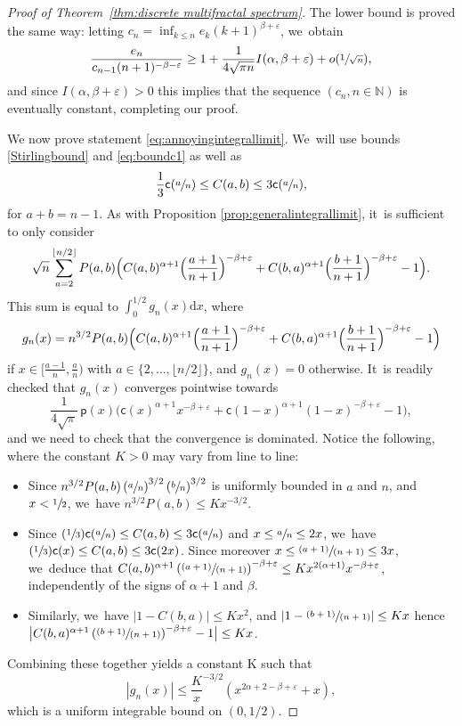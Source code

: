 \documentclass[11pt]{article}
\let\epsilon\varepsilon
\newcommand{\Psfrac}[2]{(\sfrac{#1}{#2})}
\newcommand{\pspfrac}[2]{\sfrac{(#1)}{(#2)}}
\newcommand{\pp}{\mathsf{p}}
\newcommand{\cc}{\mathsf{c}}\let\ff\cc
\newcommand{\N}{\mathbb{N}}
\let\veps\varepsilon
\theoremstyle{definition}
\begin{document}
\begin{proof}[Proof of Theorem~\ref{thm:discrete multifractal spectrum}]
The lower bound is proved the same way: letting $c_n=\inf_{k\leq n}e_k (k+1)^{\beta+\veps}$, we~obtain\vspace*{-3pt}
\[
\frac{e_n}{c_{n-1}(n+1)^{-\beta-\veps}} \geq 1 + \frac1{4\sqrt{\pi n}}I(\alpha,\beta+\veps) + o(\sfrac1{\sqrt{n}}),
\]
and since $I(\alpha,\beta+\veps)>0$ this implies that the sequence $(c_n,n\in\N)$ is eventually constant, completing our proof.

We now prove statement \eqref{eq:annoyingintegrallimit}. We~will use bounds \eqref{Stirlingbound} and \eqref{eq:boundc1} as well as\vspace*{-3pt}
\[
\frac1{3} \cc{\left(\sfrac{a}{n}\right)}\leq C(a,b)\leq 3 \cc{(\sfrac{a}{n})},
\]
for $a+b=n-1$. As with Proposition \ref{prop:generalintegrallimit}, it~is sufficient to only consider\vspace*{-3pt}
\[
\sqrt{n}\sum_{a=2}^{\lfloor n/2 \rfloor}P(a,b)\Bigl(C(a,b)^{\alpha+1}\Bigl(\frac{a+1}{n+1}\Bigr)^{-\beta+\veps}+C(b,a)^{\alpha+1}\Bigl(\frac{b+1}{n+1}\Bigr)^{-\beta+\veps}-1\Bigr).
\]
This sum is equal to $\int_0^{1/2} g_n(x)\mathrm{d}x$, where\vspace*{-3pt}
\[
g_n(x)= n^{3/2}P(a,b)\Bigl(C(a,b)^{\alpha+1}\Bigl(\frac{a+1}{n+1}\Bigr)^{-\beta+\veps}+C(b,a)^{\alpha+1}\Bigl(\frac{b+1}{n+1}\Bigr)^{-\beta+\veps}-1\Bigr)
\]
if $x\in[\frac{a-1}{n},\frac{a}{n})$ with $a\in \{2,\ldots,\lfloor n/2 \rfloor\}$, and $g_n(x)=0$ otherwise. It~is readily checked that $g_n(x)$ converges pointwise towards\vspace*{-3pt}
\[
\frac{1}{4\sqrt{\pi}}\, \pp(x)\bigl(\ff(x)^{\alpha+1} x^{-\beta+\veps}+\ff(1-x)^{\alpha+1} (1-x)^{-\beta+\veps}-1\bigr),
\]
and we need to check that the convergence is dominated. Notice the following, where the constant $K>0$ may vary from line to line:
\begin{itemize}
\item Since $n^{3/2} P(a,b)\left(\sfrac{a}{n}\right)^{3/2}\left(\sfrac{b}{n}\right)^{3/2}$ is uniformly bounded in $a$ and $n$, and $x<\sfrac{1}{2}$, we~have $n^{3/2}P(a,b)\leq K x^{-3/2}$.
\item Since $\Psfrac1{3}\ff(\sfrac{a}{n})\leq C(a,b)\leq 3\ff(\sfrac{a}{n})$ and $x\leq \sfrac{a}{n}\leq 2x$, we~have $\Psfrac1{3}\ff(x)\leq C(a,b)\leq 3\ff(2x)$. Since moreover $x\leq\pspfrac{a+1}{n+1}\leq 3x$, we~deduce that $C(a,b)^{\alpha+1} \left(\pspfrac{a+1}{n+1}\right)^{-\beta+\epsilon}\leq K x^{2(\alpha+1)}x^{-\beta+\veps}$, independently of the signs of $\alpha+1$ and $\beta$.
\item Similarly, we~have $|1-C(b,a)|\leq Kx^2$, and $\left|1-\pspfrac{b+1}{n+1}\right|\leq Kx$ hence $\bigl|C(b,a)^{\alpha+1}\left(\pspfrac{b+1}{n+1}\right)^{-\beta+\epsilon}-1\bigr| \leq K x$.
\end{itemize}

Combining these together yields a constant K such that
\[
|g_n(x)|\leq \frac{K}x^{-3/2}\left(x^{2\alpha+2-\beta+\veps}+x\right),
\]
which is a uniform integrable bound on $(0,1/2)$.
\end{proof}
\end{document}

